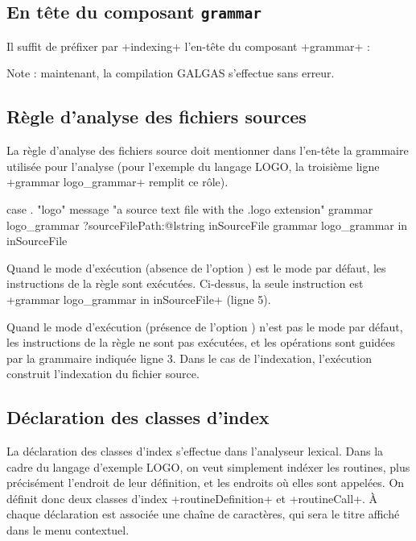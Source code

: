 \subsection{En tête du composant \texttt{grammar}}

Il suffit de préfixer par \ggs+indexing+ l'en-tête du composant \ggs+grammar+ :

\begin{galgas}
indexing grammar logo_grammar ... {
  ...
\end{galgas}

Note : maintenant, la compilation GALGAS s'effectue sans erreur.




\subsection{Règle d'analyse des fichiers sources}

La règle d'analyse des fichiers source doit mentionner dans l'en-tête la grammaire utilisée pour l'analyse (pour l'exemple du langage LOGO, la troisième ligne \ggs+grammar logo_grammar+ remplit ce rôle).

\begin{galgas}
case . "logo"
message "a source text file with the .logo extension"
grammar logo_grammar
?sourceFilePath:@lstring inSourceFile {
  grammar logo_grammar in inSourceFile
}
\end{galgas}

Quand le mode d'exécution (absence de l'option ) est le mode par défaut, les instructions de la règle sont exécutées. Ci-dessus, la seule instruction est \ggs+grammar logo_grammar in inSourceFile+ (ligne 5).

Quand le mode d'exécution (présence de l'option ) n'est pas le mode par défaut, les instructions de la règle ne sont pas exécutées, et les opérations sont guidées par la grammaire indiquée ligne 3. Dans le cas de l'indexation, l'exécution construit l'indexation du fichier source.









\subsection{Déclaration des classes d'index}

La déclaration des classes d'index s'effectue dans l'analyseur lexical. Dans la cadre du langage d'exemple LOGO, on veut simplement indéxer les routines, plus précisément l'endroit de leur définition, et les endroits où elles sont appelées. On définit donc deux classes d'index \ggs+routineDefinition+ et \ggs+routineCall+. À chaque déclaration est associée une chaîne de caractères, qui sera le titre affiché dans le menu contextuel. 


